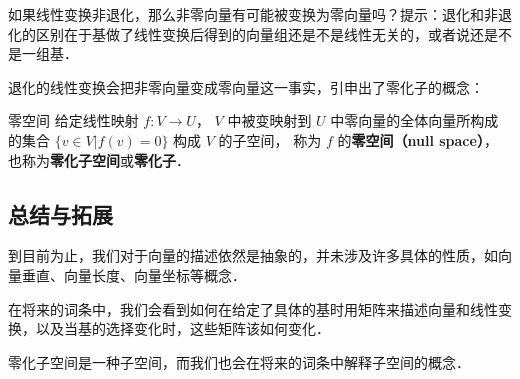 \begin{exercise}{}
如果线性变换非退化，那么非零向量有可能被变换为零向量吗？提示：退化和非退化的区别在于基做了线性变换后得到的向量组还是不是线性无关的，或者说还是不是一组基．
\end{exercise}

退化的线性变换会把非零向量变成零向量这一事实，引申出了零化子的概念：

\begin{theorem}{零空间}\label{LinMap_the1}
给定线性映射 $f:V\to U$， $V$ 中被变映射到 $U$ 中零向量的全体向量所构成的集合 $\{{v}\in V|f(v)= 0\}$ 构成 $V$ 的子空间， 称为 $f$ 的\textbf{零空间（null space）}， 也称为\textbf{零化子空间}或\textbf{零化子}．
\end{theorem}

\subsection{总结与拓展}

到目前为止，我们对于向量的描述依然是抽象的，并未涉及许多具体的性质，如向量垂直、向量长度、向量坐标等概念．

在将来的词条中，我们会看到如何在给定了具体的基时用矩阵来描述向量和线性变换，以及当基的选择变化时，这些矩阵该如何变化．

零化子空间是一种子空间，而我们也会在将来的词条中解释子空间的概念．
